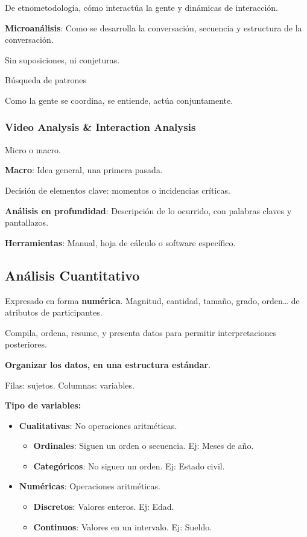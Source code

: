De etnometodología, cómo interactúa la gente y dinámicas de interacción.

\textbf{Microanálisis}: Como se desarrolla la conversación, secuencia y
estructura de la conversación.

Sin suposiciones, ni conjeturas.

Búsqueda de patrones

Como la gente se coordina, se entiende, actúa conjuntamente.

\hypertarget{video-analysis-interaction-analysis}{%
\subsubsection{Video Analysis \& Interaction
Analysis}\label{video-analysis-interaction-analysis}}

Micro o macro.

\textbf{Macro}: Idea general, una primera pasada.

Decisión de elementos clave: momentos o incidencias críticas.

\textbf{Análisis en profundidad}: Descripción de lo ocurrido, con
palabras claves y pantallazos.

\textbf{Herramientas}: Manual, hoja de cálculo o software específico.

\hypertarget{anuxe1lisis-cuantitativo}{%
\subsection{Análisis Cuantitativo}\label{anuxe1lisis-cuantitativo}}

Expresado en forma \textbf{numérica}. Magnitud, cantidad, tamaño, grado,
orden\ldots{} de atributos de participantes.

Compila, ordena, resume, y presenta datos para permitir interpretaciones
posteriores.

\textbf{Organizar los datos, en una estructura estándar}.

Filas: sujetos. Columnas: variables.

\textbf{Tipo de variables:}

\begin{itemize}
\tightlist
\item
  \textbf{Cualitativas}: No operaciones aritméticas.

  \begin{itemize}
  \tightlist
  \item
    \textbf{Ordinales}: Siguen un orden o secuencia. Ej: Meses de año.
  \item
    \textbf{Categóricos}: No siguen un orden. Ej: Estado civil.
  \end{itemize}
\item
  \textbf{Numéricas}: Operaciones aritméticas.

  \begin{itemize}
  \tightlist
  \item
    \textbf{Discretos}: Valores enteros. Ej: Edad.
  \item
    \textbf{Continuos}: Valores en un intervalo. Ej: Sueldo.
  \end{itemize}
\end{itemize}

